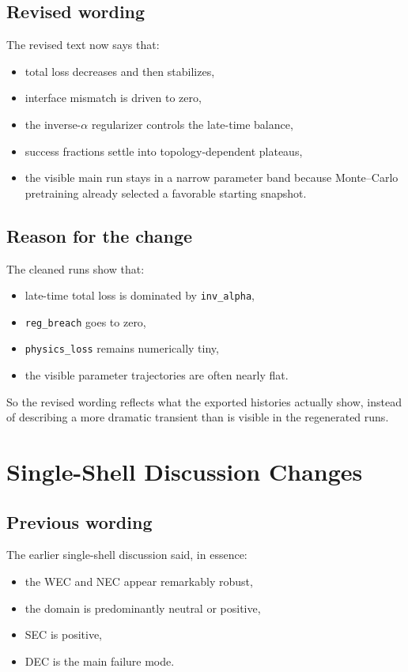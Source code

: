 \documentclass[11pt]{article}
\begin{document}
\subsection*{Revised wording}
The revised text now says that:
\begin{itemize}[leftmargin=*]
\item total loss decreases and then stabilizes,
\item interface mismatch is driven to zero,
\item the inverse-$\alpha$ regularizer controls the late-time balance,
\item success fractions settle into topology-dependent plateaus,
\item the visible main run stays in a narrow parameter band because Monte--Carlo pretraining already selected a favorable starting snapshot.
\end{itemize}

\subsection*{Reason for the change}
The cleaned runs show that:
\begin{itemize}[leftmargin=*]
\item late-time total loss is dominated by \texttt{inv\_alpha},
\item \texttt{reg\_breach} goes to zero,
\item \texttt{physics\_loss} remains numerically tiny,
\item the visible parameter trajectories are often nearly flat.
\end{itemize}

So the revised wording reflects what the exported histories actually show, instead of describing a
more dramatic transient than is visible in the regenerated runs.

\section*{Single-Shell Discussion Changes}
\subsection*{Previous wording}
The earlier single-shell discussion said, in essence:
\begin{itemize}[leftmargin=*]
\item the WEC and NEC appear remarkably robust,
\item the domain is predominantly neutral or positive,
\item SEC is positive,
\item DEC is the main failure mode.
\end{itemize}
\end{document}
